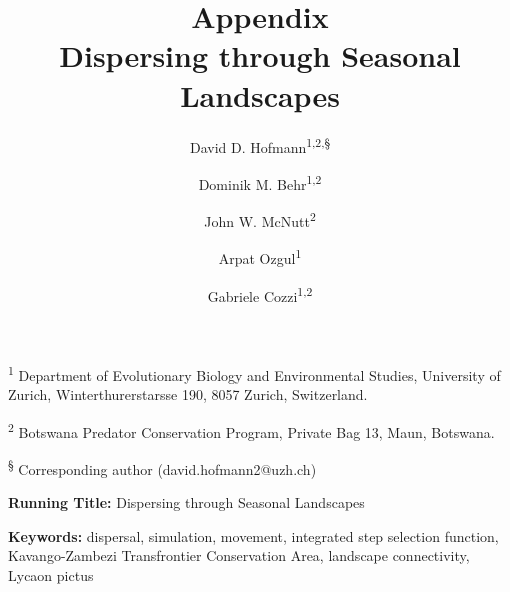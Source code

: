 \documentclass[abstract=off,10pt,a4paper,bibliography=totocnumbered]{article}
\title{\textbf{Appendix}\\ Dispersing through Seasonal Landscapes}
\author{
  David D. Hofmann\textsuperscript{1,2,\S} \and
  Dominik M. Behr\textsuperscript{1,2} \and
  John W. McNutt\textsuperscript{2} \and
  Arpat Ozgul\textsuperscript{1} \and
  Gabriele Cozzi\textsuperscript{1,2}
}
\newcommand{\beginappendix}{%
  \setcounter{table}{0}
  \renewcommand{\thetable}{S\arabic{table}}%
  \setcounter{figure}{0}
  \renewcommand{\thefigure}{S\arabic{figure}}%
  \setcounter{equation}{0}
  \renewcommand{\theequation}{Equation S\arabic{equation}}%
  \setcounter{section}{0}
  \renewcommand{\thesection}{A.\arabic{section}}%
}
\begin{document}



\maketitle

\begin{flushleft}

 \vspace{0.5cm}

 \textsuperscript{1} Department of Evolutionary Biology and Environmental
 Studies, University of Zurich, Winterthurerstarsse 190, 8057 Zurich,
 Switzerland.

 \textsuperscript{2} Botswana Predator Conservation Program, Private Bag 13,
 Maun, Botswana.

 \textsuperscript{\S} Corresponding author (david.hofmann2@uzh.ch)

 \vspace{4cm}

\textbf{Running Title:} Dispersing through Seasonal Landscapes

\vspace{0.5cm}

\textbf{Keywords:} dispersal, simulation, movement, integrated step selection
function, Kavango-Zambezi Transfrontier Conservation Area, landscape
connectivity, Lycaon pictus

\end{flushleft}

\newpage



\appendix
\beginappendix

\newpage
\end{document}
